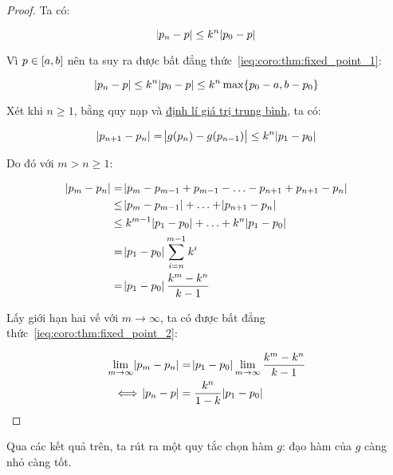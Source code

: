 \documentclass[../../Lectures.tex]{subfiles}
\begin{document}
\begin{proof}
    Ta có:

    \[\abs{p_n - p} \leq k^n \abs{p_0 - p}\]

    Vì \(p \in \interval{a}{b}\) nên ta suy ra được bất đẳng
    thức~\ref{ieq:coro:thm:fixed_point_1}:

    \[\abs{p_n - p} \leq k^n \abs{p_0 - p} \leq k^n \max \{p_0 - a, b - p_0\}\]

    Xét khi \(n \geq 1\), bằng quy nạp và
    \hyperref[thm:mean_value_theorem]{định lí giá trị trung bình}, ta có:

    \[\abs{p_{n + 1} - p_n} = \abs{g(p_n) - g(p_{n - 1})} \leq k^n \abs{p_1 - p_0}\]

    Do đó với \(m > n \geq 1\):

    \[\begin{aligned}
        \abs{p_m - p_n} & = \abs{p_m - p_{m - 1} + p_{m - 1} - \ldots - p_{n + 1} + p_{n + 1} - p_n} \\
                        & \leq \abs{p_m - p_{m - 1}} + \ldots + \abs{p_{n + 1} - p_n}                \\
                        & \leq k^{m - 1} \abs{p_1 - p_0} + \ldots + k^n \abs{p_1 - p_0}              \\
                        & = \abs{p_1 - p_0} \sum_{i = n}^{m - 1} k^i                                 \\
                        & = \abs{p_1 - p_0} \frac{k^m - k^n}{k - 1}
    \end{aligned}\]

    Lấy giới hạn hai vế với \(m \to \infty\), ta có được bất đẳng
    thức~\ref{ieq:coro:thm:fixed_point_2}:

    \[\begin{aligned}
        \lim_{m \to \infty} \abs{p_m - p_n} & = \abs{p_1 - p_0} \lim_{m \to \infty} \frac{k^m - k^n}{k - 1} \\
        \iff                  \abs{p_n - p} & = \frac{k^n}{1 - k} \abs{p_1 - p_0}
    \end{aligned}\]
\end{proof}

Qua các kết quả trên, ta rút ra một quy tắc chọn hàm \(g\): đạo hàm của \(g\)
càng nhỏ càng tốt.
\end{document}
